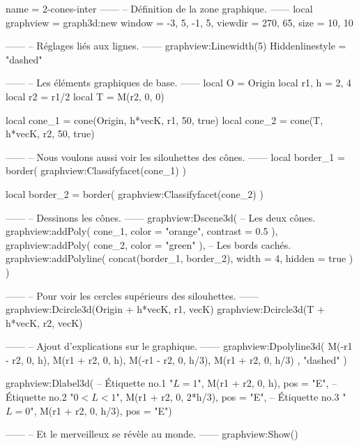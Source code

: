 \documentclass{standalone}
\begin{document}
\begin{luadraw}{name = 2-cones-inter}
------
-- Définition de la zone graphique.
------
local graphview = graph3d:new{
  window  = {-3, 5, -1, 5},
  viewdir = {270, 65},
  size    = {10, 10}
}

------
-- Réglages liés aux lignes.
------
graphview:Linewidth(5)
Hiddenlinestyle = "dashed"

------
-- Les éléments graphiques de base.
------
local O     = Origin
local r1, h =  2, 4
local r2    = r1/2
local T     =  M(r2, 0, 0)

local cone_1 = cone(Origin, h*vecK, r1, 50, true)
local cone_2 = cone(T, h*vecK, r2, 50, true)

------
-- Nous voulons aussi voir les silouhettes des cônes.
------
local border_1 = border(
  graphview:Classifyfacet(cone_1)
)

local border_2 = border(
  graphview:Classifyfacet(cone_2)
)

------
-- Dessinons les cônes.
------
graphview:Dscene3d(
-- Les deux cônes.
  graphview:addPoly(
    cone_1,
    {
      color    = "orange",
      contrast = 0.5
    }),
  graphview:addPoly(
    cone_2,
    {
      color = "green"
    }),
-- Les bords cachés.
  graphview:addPolyline(
    concat(border_1, border_2),
    {
      width  = 4,
      hidden = true
    })
)

------
-- Pour voir les cercles supérieurs des silouhettes.
------
graphview:Dcircle3d(Origin + h*vecK, r1, vecK)
graphview:Dcircle3d(T + h*vecK, r2, vecK)

------
-- Ajout d'explications sur le graphique.
------
graphview:Dpolyline3d(
  {
    {M(-r1 - r2,  0,  h), M(r1 + r2,  0,  h)},
    {M(-r1 - r2,  0,  h/3), M(r1 + r2,  0,  h/3)}
  },
  "dashed"
)

graphview:Dlabel3d(
-- Étiquette no.1
  "$L = 1$",
  M(r1 + r2, 0, h),
  {pos = "E"},
-- Étiquette no.2
  "$0 < L <1$",
  M(r1 + r2, 0, 2*h/3),
  {pos = "E"},
-- Étiquette no.3
  "$L = 0$",
  M(r1 + r2, 0, h/3),
  {pos = "E"})

------
-- Et le merveilleux se révèle au monde.
------
graphview:Show()
\end{luadraw}
\end{document}
